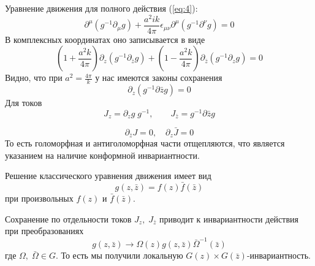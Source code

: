 \documentclass[a4paper,12pt]{article}
\theoremstyle{definition} \newtheorem{Def}{Definition}
\begin{document}
Уравнение движения для полного действия (\ref{eq:4}):
\begin{equation}
  \label{eq:77}
  \partial^{\mu}(g^{-1}\partial_{\mu}g)+\frac{a^2 ik}{4\pi}\epsilon_{\mu\nu}\partial^{\mu}(g^{-1}\partial^{\nu}g)=0
\end{equation}
В комплексных координатах оно записывается в виде
\begin{equation}
  \label{eq:78}
  (1+\frac{a^2 k}{4\pi})\partial_z(g^{-1}\partial_{\bar z}g)+(1-\frac{a^2 k}{4\pi})\partial_{\bar z}(g^{-1}\partial_z g)=0
\end{equation}
Видно, что при $a^2=\frac{4\pi}{k}$ у нас имеются законы сохранения
\begin{equation}
  \label{eq:79}
  \partial_z(g^{-1}\partial{\bar z}g)=0
\end{equation}
Для токов
\begin{equation}
  \label{eq:72}
  J_z=\partial_z g\;g^{-1}, \qquad J_{\bar{z}}=g^{-1}\partial{\bar z}g
\end{equation}

\begin{equation}
  \label{eq:100}
  \partial_{\bar z}J=0,\quad \partial_z \bar J=0
\end{equation}
То есть голоморфная и антиголоморфная части отщепляются, что является указанием на наличие
конформной инвариантности.

Решение классического уравнения движения имеет вид
\begin{equation}
  \label{eq:80}
  g(z,\bar z)=f(z)\bar f(\bar z)
\end{equation}
при произвольных $f(z)$ и $\bar f (\bar z)$.

Сохранение по отдельности токов $J_z,\; J_{\bar z}$ приводит к инвариантности действия при преобразованиях
\begin{equation}
  \label{eq:81}
   g(z,\bar z)\to \Omega(z)g(z,\bar z)\bar \Omega^{-1}(\bar z)
\end{equation}
где $\Omega,\;\bar \Omega \in G$. То есть мы получили локальную $G(z)\times G(\bar z)$-инвариантность.
\end{document}
